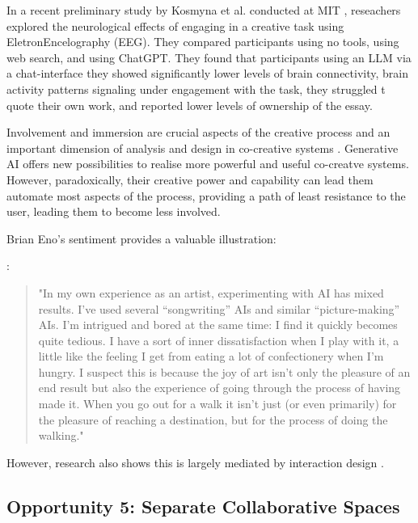 In a recent preliminary study by Kosmyna et al. conducted at MIT \cite{Kosmyna2025-cm}, reseachers explored the neurological effects of engaging in a creative task using EletronEncelography (EEG). They compared participants using no tools, using web search, and using ChatGPT. They found that participants using an LLM via a chat-interface they showed significantly lower levels of brain connectivity, brain activity patterns signaling under engagement with the task, they struggled t quote their own work, and reported lower levels of ownership of the essay. 

Involvement and immersion are crucial aspects of the creative process \cite{Amabile1996-pt, Csikszentmihalyi1997-ui} and an important dimension of analysis and design in co-creative systems \cite{Davis2016-te, Cherry2014-ty, Rezwana2022-ui, Clark2018-yf, Lawton2023-gd, Yuan2022-kb, Li2024-yh, Kantosalo2015-pk, Resnick2005-fs}. Generative AI offers new possibilities to realise more powerful and useful co-creatve systems. However, paradoxically, their creative power and capability can lead them automate most aspects of the process, providing a path of least resistance to the user, leading them to become less involved. 

Brian Eno's sentiment provides a valuable illustration: 

\cite{Eno2024-rj}:
\begin{quote}
"In my own experience as an artist, experimenting with AI has mixed results. I’ve used several “songwriting” AIs and similar “picture-making” AIs. I’m intrigued and bored at the same time: I find it quickly becomes quite tedious. I have a sort of inner dissatisfaction when I play with it, a little like the feeling I get from eating a lot of confectionery when I’m hungry. I suspect this is because the joy of art isn’t only the pleasure of an end result but also the experience of going through the process of having made it. When you go out for a walk it isn’t just (or even primarily) for the pleasure of reaching a destination, but for the process of doing the walking."
\end{quote}

However, research also shows this is largely mediated by interaction design \cite{Kim2023-wt, Essel2024-qc}. 

\subsection{Opportunity 5: Separate Collaborative Spaces}

